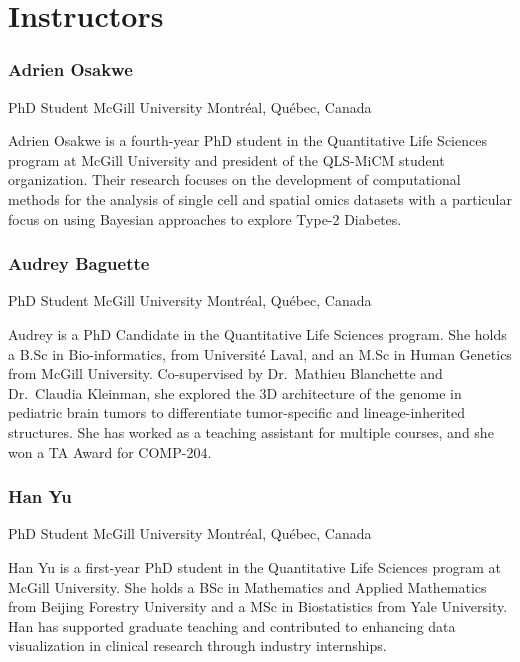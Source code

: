 \documentclass[
]{book}
\begin{document}
\section{Instructors}\label{instructors}

\subsubsection{Adrien Osakwe}\label{adrien-osakwe}

PhD Student
McGill University
Montréal, Québec, Canada

Adrien Osakwe is a fourth-year PhD student in the Quantitative Life Sciences program at McGill University and president of the QLS-MiCM student organization. Their research focuses on the development of computational methods for the analysis of single cell and spatial omics datasets with a particular focus on using Bayesian approaches to explore Type-2 Diabetes.

\subsubsection{Audrey Baguette}\label{audrey-baguette}

PhD Student
McGill University
Montréal, Québec, Canada

Audrey is a PhD Candidate in the Quantitative Life Sciences program. She holds a B.Sc in Bio-informatics, from Université Laval, and an M.Sc in Human Genetics from McGill University. Co-supervised by Dr.~Mathieu Blanchette and Dr.~Claudia Kleinman, she explored the 3D architecture of the genome in pediatric brain tumors to differentiate tumor-specific and lineage-inherited structures. She has worked as a teaching assistant for multiple courses, and she won a TA Award for COMP-204.

\subsubsection{Han Yu}\label{han-yu}

PhD Student
McGill University
Montréal, Québec, Canada

Han Yu is a first-year PhD student in the Quantitative Life Sciences program at McGill University. She holds a BSc in Mathematics and Applied Mathematics from Beijing Forestry University and a MSc in Biostatistics from Yale University. Han has supported graduate teaching and contributed to enhancing data visualization in clinical research through industry internships.
\end{document}
